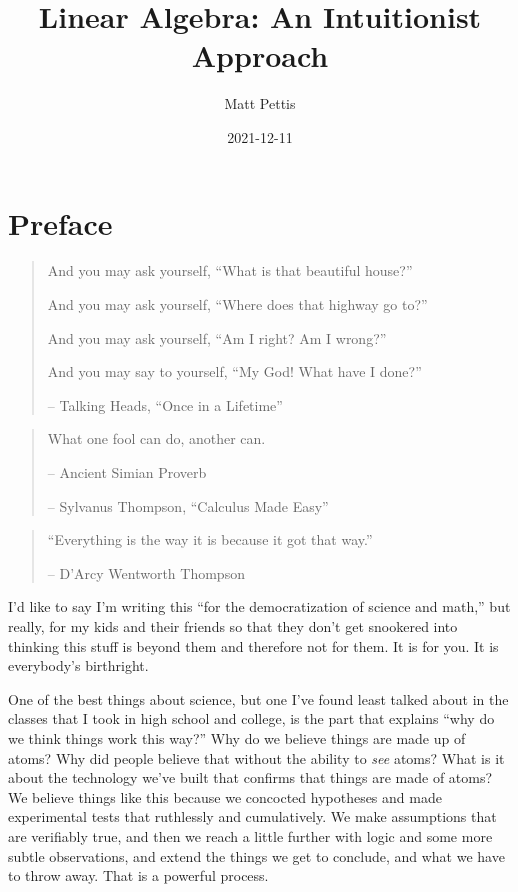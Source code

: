 \documentclass[
]{book}
\title{Linear Algebra: An Intuitionist Approach}
\author{Matt Pettis}
\date{2021-12-11}
\begin{document}
\maketitle

{
\setcounter{tocdepth}{1}
\tableofcontents
}
\hypertarget{preface}{%
\chapter{Preface}\label{preface}}

\begin{quote}
And you may ask yourself, ``What is that beautiful house?''

And you may ask yourself, ``Where does that highway go to?''

And you may ask yourself, ``Am I right? Am I wrong?''

And you may say to yourself, ``My God! What have I done?''

-- Talking Heads, ``Once in a Lifetime''
\end{quote}

\begin{quote}
What one fool can do, another can.

-- Ancient Simian Proverb

-- Sylvanus Thompson, ``Calculus Made Easy''
\end{quote}

\begin{quote}
``Everything is the way it is because it got that way.''

-- D'Arcy Wentworth Thompson
\end{quote}

I'd like to say I'm writing this ``for the democratization of science and math,'' but really, for my kids and their friends so that they don't get snookered into thinking this stuff is beyond them and therefore not for them. It is for you. It is everybody's birthright.

One of the best things about science, but one I've found least talked about in the classes that I took in high school and college, is the part that explains ``why do we think things work this way?'' Why do we believe things are made up of atoms? Why did people believe that without the ability to \emph{see} atoms? What is it about the technology we've built that confirms that things are made of atoms? We believe things like this because we concocted hypotheses and made experimental tests that ruthlessly and cumulatively. We make assumptions that are verifiably true, and then we reach a little further with logic and some more subtle observations, and extend the things we get to conclude, and what we have to throw away. That is a powerful process.
\end{document}
